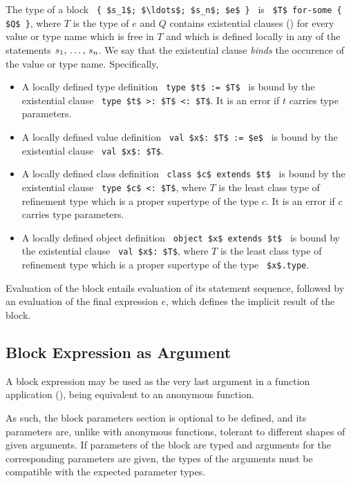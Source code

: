 The type of a block ~\lstinline!{ $s_1$; $\ldots$; $s_n$; $e$ }!~ is ~\lstinline!$T$ for-some { $Q$ }!, where $T$ is the type of $e$ and $Q$ contains existential clauses () for every value or type name which is free in $T$ and which is defined locally in any of the statements $s_1 ,\, \ldots ,\, s_n$. We say that the existential clause {\em binds} the occurence of the value or type name. Specifically, 
\begin{itemize}

\item A locally defined type definition ~\lstinline!type $t$ := $T$!~ is bound by the existential clause ~\lstinline!type $t$ >: $T$ <: $T$!. It is an error if $t$ carries type parameters. 

\item A locally defined value definition ~\lstinline!val $x$: $T$ := $e$!~ is bound by the existential clause ~\lstinline!val $x$: $T$!. 

\item A locally defined class definition ~\lstinline!class $c$ extends $t$!~ is bound by the existential clause ~\lstinline!type $c$ <: $T$!, where $T$ is the least class type of refinement type which is a proper supertype of the type $c$. It is an error if $c$ carries type parameters. 

\item A locally defined object definition ~\lstinline!object $x$ extends $t$!~ is bound by the existential clause ~\lstinline!val $x$: $T$!, where $T$ is the least class type of refinement type which is a proper supertype of the type ~\lstinline!$x$.type!.
\end{itemize}

Evaluation of the block entails evaluation of its statement sequence, followed by an evaluation of the final expression $e$, which defines the implicit result of the block. 





\subsection{Block Expression as Argument}
\label{sec:block-arguments}

A block expression may be used as the very last argument in a function application (), being equivalent to an anonymous function. 

As such, the block parameters section is optional to be defined, and its parameters are, unlike with anonymous functions, tolerant to different shapes of given arguments. If parameters of the block are typed and arguments for the corresponding parameters are given, the types of the arguments must be compatible with the expected parameter types. 


